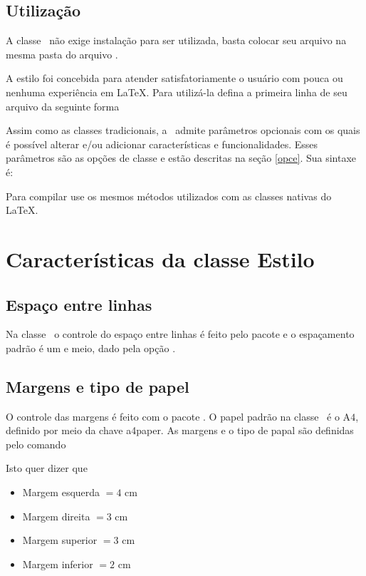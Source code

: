 \section{Utilização}

A classe \estilo\ não exige instalação para ser utilizada,
basta colocar seu arquivo  na mesma pasta do
arquivo \estiloc. 

A estilo foi concebida para atender satisfatoriamente o usuário com pouca ou 
nenhuma experiência em \LaTeX. Para utilizá-la defina a primeira linha de 
seu arquivo  da seguinte forma

\begin{center}
\end{center}

Assim como as classes tradicionais, a \estilo\ admite parâmetros opcionais 
com os quais é possível alterar e/ou adicionar características e 
funcionalidades. Esses parâmetros são as opções de classe e estão 
descritas na seção \ref{opce}. Sua sintaxe é:

\begin{center}
\end{center}

Para compilar use os mesmos métodos utilizados com as classes nativas do \LaTeX.


\chapter{Características da classe Estilo}


\section{Espaço entre linhas}\label{entrelinha}

Na classe \estilo\, o controle do espaço entre linhas é feito pelo pacote  e o espaçamento padrão é um e meio, dado pela opção .

\section{Margens e tipo de papel}\label{margens}

O controle das margens é feito com o pacote . O papel padrão na classe \estilo\ é o A$4$, definido por meio da chave a4paper. As margens e o tipo de papal são definidas pelo comando
\begin{center}
\end{center}
Isto quer dizer que
\begin{multicols}{2}
\begin{itemize}
	\item Margem esquerda $=4$ cm
	\item Margem direita $=3$ cm
	\item Margem superior $=3$ cm
	\item Margem inferior $=2$ cm
\end{itemize}
\end{multicols}


